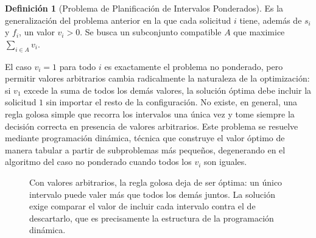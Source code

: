 \documentclass[12pt, spanish, oneside, openany]{book}
\theoremstyle{uprightplain}
\theoremstyle{definition}
\newtheorem{definicion}[teorema]{Definición}
\theoremstyle{remark}
\theoremstyle{definition}
\begin{document}
\begin{definicion}[Problema de Planificación de Intervalos Ponderados]
\label{def:interval-pesado}
Es la generalización del problema anterior en la que cada solicitud $i$ tiene, además de $s_i$ y $f_i$, un valor $v_i > 0$. Se busca un subconjunto compatible $A$ que maximice $\sum_{i \in A} v_i$.
\end{definicion}

El caso $v_i = 1$ para todo $i$ es exactamente el problema no ponderado, pero permitir valores arbitrarios cambia radicalmente la naturaleza de la optimización: si $v_1$ excede la suma de todos los demás valores, la solución óptima debe incluir la solicitud $1$ sin importar el resto de la configuración. No existe, en general, una regla golosa simple que recorra los intervalos una única vez y tome siempre la decisión correcta en presencia de valores arbitrarios. Este problema se resuelve mediante programación dinámica, técnica que construye el valor óptimo de manera tabular a partir de subproblemas más pequeños, degenerando en el algoritmo del caso no ponderado cuando todos los $v_i$ son iguales.
\begin{figure}[H]
\centering
{}
\caption{Con valores arbitrarios, la regla golosa deja de ser óptima: un único
intervalo puede valer más que todos los demás juntos. La solución exige
comparar el valor de incluir cada intervalo contra el de descartarlo, que es
precisamente la estructura de la programación dinámica.}
\label{fig:intervalos-pesados}
\end{figure}
\end{document}
